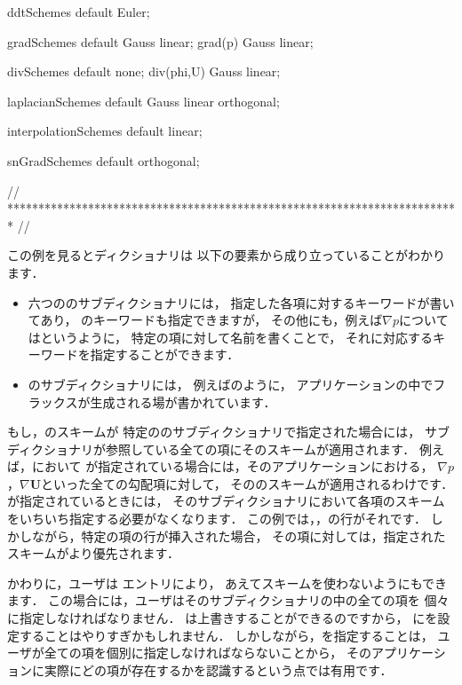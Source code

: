 \begin{OFverbatim}[file, linenum=17]

ddtSchemes
{
    default         Euler;
}

gradSchemes
{
    default         Gauss linear;
    grad(p)         Gauss linear;
}

divSchemes
{
    default         none;
    div(phi,U)      Gauss linear;
}

laplacianSchemes
{
    default         Gauss linear orthogonal;
}

interpolationSchemes
{
    default         linear;
}

snGradSchemes
{
    default         orthogonal;
}


// ************************************************************************* //
\end{OFverbatim}
この例を見るとディクショナリは
以下の要素から成り立っていることがわかります．
\begin{itemize}
 \item 六つののサブディクショナリには，
       指定した各項に対するキーワードが書いてあり，
       のキーワードも指定できますが，
       その他にも，例えば$\nabla p$についてはというように，
       特定の項に対して名前を書くことで，
       それに対応するキーワードを指定することができます．
 \item {}のサブディクショナリには，
       例えばのように，
       アプリケーションの中でフラックスが生成される場が書かれています．
\end{itemize}
もし，のスキームが
特定ののサブディクショナリで指定された場合には，
サブディクショナリが参照している全ての項にそのスキームが適用されます．
例えば，において
が指定されている場合には，そのアプリケーションにおける，
$\nabla p$，$\nabla\bm{U}$といった全ての勾配項に対して，
そののスキームが適用されるわけです．
が指定されているときには，
そのサブディクショナリにおいて各項のスキームをいちいち指定する必要がなくなります．
この例では，，の行がそれです．
しかしながら，特定の項の行が挿入された場合，
その項に対しては，指定されたスキームがより優先されます．

かわりに，ユーザは
%
%
エントリにより，
あえてスキームを使わないようにもできます．
この場合には，ユーザはそのサブディクショナリの中の全ての項を
個々に指定しなければなりません．
は上書きすることができるのですから，
にを設定することはやりすぎかもしれません．
しかしながら，を指定することは，
ユーザが全ての項を個別に指定しなければならないことから，
そのアプリケーションに実際にどの項が存在するかを認識するという点では有用です．

